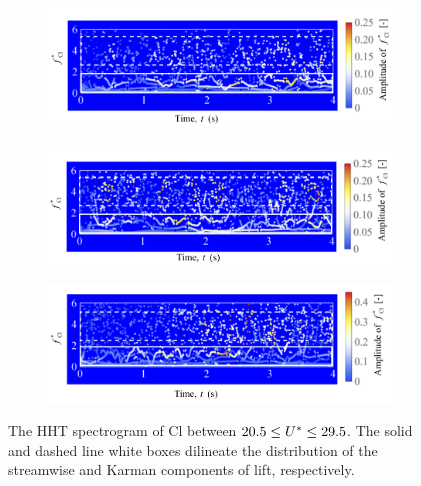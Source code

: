 \documentclass[oneside]{utmthesis}
\begin{document}
\begin{figure}
  \centering
  \begin{subfigure}[h]{1\textwidth}
    \includegraphics[width=\textwidth]{figs/instantLiftFreq-a}
    \caption{}
    \label{fig:instantLiftFreq-a}
  \end{subfigure}

  \begin{subfigure}[h]{1\textwidth}
    \includegraphics[width=\textwidth]{figs/instantLiftFreq-b}
    \caption{}
    \label{fig:instantLiftFreq-b}
  \end{subfigure}

  \begin{subfigure}[h]{1\textwidth}
    \includegraphics[width=\textwidth]{figs/instantLiftFreq-c}
    \caption{}
    \label{fig:instantLiftFreq-c}
  \end{subfigure}
  \caption{The HHT spectrogram of Cl between $20.5 \leq U^{*} \leq 29.5$. The solid and dashed line white boxes dilineate the distribution of the streamwise and Karman components of lift, respectively.}
\end{figure}
\end{document}
